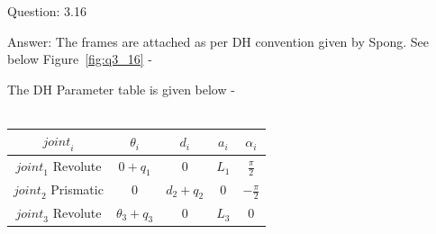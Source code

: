 \documentclass[a4paper]{article}
\begin{document}
\begin{qalist}
		\item[Question: 3.16] \setcounter{equation}{0} %
		\item[Answer:] The frames are attached as per DH convention given by Spong. See below Figure~\ref{fig:q3_16} -\\
			\begin{minipage}{\linewidth}
				\vspace{0.5cm}
				\centering
				\label{fig:q3_16}
				\vspace{0.5cm}
			\end{minipage}
			The DH Parameter table is given below - \\ \\
			\begin{minipage}{\linewidth}
				\centering
				\begin{tabular}{|c|c|c|c|c|}
					\hline
					${joint}_{i}$ & ${\theta}_{i}$ & ${d}_{i}$ & ${a}_{i}$ & ${\alpha}_{i}$\\
					\hline
					${joint}_{1}$ Revolute & $0 + {q}_{1}$ & $0$ & ${L}_{1}$ & $\frac{\pi}{2}$\\
					\hline
					${joint}_{2}$ Prismatic & $0$ & ${d}_{2} + {q}_{2}$ & $0$ & $-\frac{\pi}{2}$\\
					\hline
					${joint}_{3}$ Revolute & ${\theta}_{3} + {q}_{3}$ & $0$ & ${L}_{3}$ & $0 $\\
					\hline
				\end{tabular}
			\end{minipage}		
			

\end{qalist}
\end{document}
